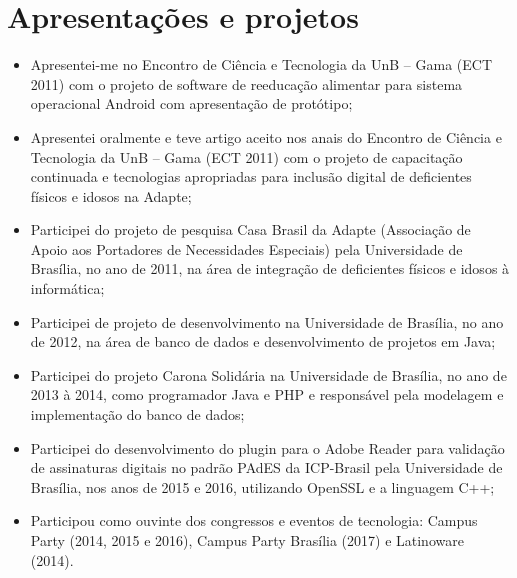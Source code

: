\section{Apresentações e projetos}

\begin{itemize}
    \item Apresentei-me no Encontro de Ciência e Tecnologia da UnB – Gama (ECT 2011) com o projeto de software de reeducação alimentar para sistema operacional Android com apresentação de protótipo;
    \item Apresentei oralmente e teve artigo aceito nos anais do Encontro de Ciência e Tecnologia da UnB – Gama (ECT 2011) com o projeto de capacitação continuada e tecnologias apropriadas para inclusão digital de deficientes físicos e idosos na Adapte;
    \item Participei do projeto de pesquisa Casa Brasil da Adapte (Associação de Apoio aos Portadores de Necessidades Especiais) pela Universidade de Brasília, no ano de 2011, na área de integração de deficientes físicos e idosos à informática;
    \item Participei de projeto de desenvolvimento na Universidade de Brasília, no ano de 2012, na área de banco de dados e desenvolvimento de projetos em Java;
    \item Participei do projeto Carona Solidária na Universidade de Brasília, no ano de 2013 à 2014, como programador Java e PHP e responsável pela modelagem e implementação do banco de dados;
    \item Participei do desenvolvimento do plugin para o Adobe Reader para validação de assinaturas digitais no padrão PAdES da ICP-Brasil pela Universidade de Brasília, nos anos de 2015 e 2016, utilizando OpenSSL e a linguagem C++;
    \item Participou como ouvinte dos congressos e eventos de tecnologia: Campus Party (2014, 2015 e 2016), Campus Party Brasília (2017) e Latinoware (2014).
\end{itemize}